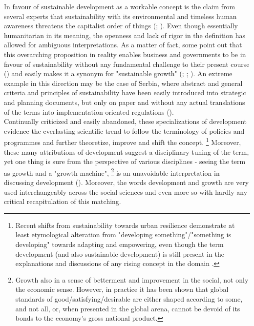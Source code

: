 \documentclass[11pt]{report}
\begin{document}
{{In favour of sustainable development as a workable concept is the claim from several experts that sustainability with its environmental and timeless human awareness threatens the capitalist order of things 
(\href{Christie}{\citealt{christie_here_2001}}; \href{Hopwood}{\citealt{hopwood_sustainable_2005}}).
Even though essentially humanitarian in its meaning, the openness and lack of rigor in the definition has allowed for ambiguous interpretations. As a matter of fact, some point out that this overarching proposition in reality enables business and governments to be in favour of sustainability without any fundamental challenge to their present course  (\href{Hopwood}{\citealt{hopwood_sustainable_2005}}) and easily makes it a synonym for "sustainable growth" (\href{Daly}{\citealt{daly_sustainable_1992}}; \href{Rees}{\citealt{hamm_understanding_2001}}; \href{Dollar}{\citealt{dollar_growth_2002}}).
An extreme example in this direction may be the case of Serbia, where abstract and general criteria and principles of sustainability have been easily introduced into strategic and planning documents, but only on paper and without any actual translations of the terms into implementation-oriented regulations (\href{Vujosevic}{\citealt{vujosevic_novi_2012}}). 
\\

Continually criticized and easily abandoned, these specializations of development evidence the everlasting scientific trend to follow the terminology of policies and programmes and further theoretize, improve and shift the concept.
\footnote{Recent shifts from sustainability towards urban resilience  demonstrate at least etymological alteration from "developing something"/"something is developing" towards adapting and empowering, even though the term development (and also sustainable development) is still present in the explanations and discussions of any rising concept in the domain {\cite{ref web of science}}.}
Moreover, these many attributions of development suggest a disciplinary tuning of the term, yet one thing is sure from the perspective of various disciplines - seeing the term as growth and a "growth machine",
\footnote{Growth also in a sense of betterment and improvement in the social, not only the economic sense. However, in practice it has been shown that global standards of good/satisfying/desirable are either shaped according to some, and not all, or, when presented in the global arena, cannot be devoid of its bonds to the economy’s gross national product.} 
is an unavoidable interpretation in discussing development (\href{Gottdiener}{\citealt{gottdiener_social_2010}}).
Moreover, the words development and growth are very used interchangeably across the social sciences and even more so with hardly any critical recapitulation of this matching.
\\

}}
\end{document}
